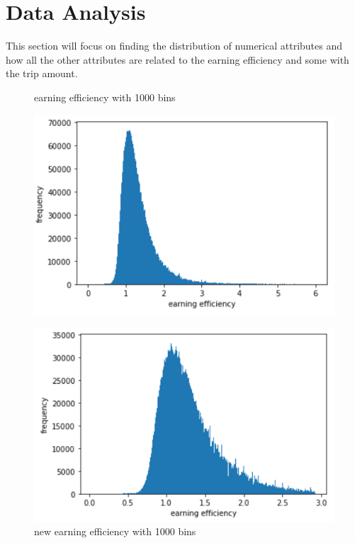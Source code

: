 \documentclass[11pt]{article}
\begin{document}
\section{Data Analysis}
This section will focus on finding the distribution of numerical attributes and how all the other attributes are related to the earning efficiency and some with the trip amount.
\begin{figure}[h]

\begin{minipage}{.5\textwidth}
    \centering
    \caption{earning efficiency with 1000 bins} \label{f1}
    \includegraphics[width=1\textwidth]{earningHist.jpg}
\end{minipage}
\begin{minipage}{.5\textwidth}
    \centering
    \caption{new earning efficiency with 1000 bins} \label{f2}
    \includegraphics[width=1\textwidth]{earningHist2.jpg}
\end{minipage}
\end{figure}
\end{document}
